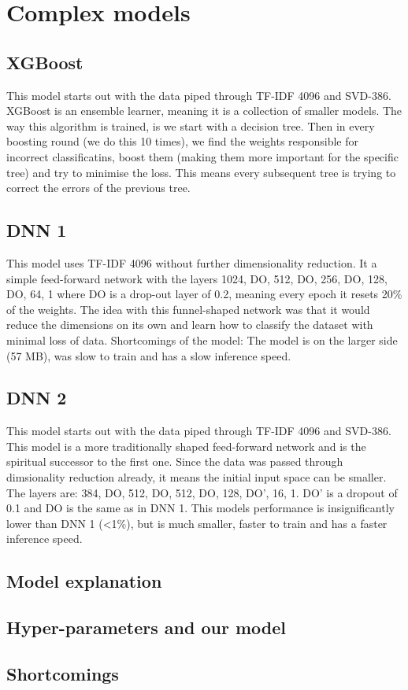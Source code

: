 \section{Complex models}
\subsection{XGBoost}
This model starts out with the data piped through TF-IDF 4096 and SVD-386. XGBoost is an ensemble learner, meaning it is a collection of smaller models. The way this algorithm is trained, is we start with a decision tree. Then in every boosting round (we do this 10 times), we find the weights responsible for incorrect classificatins, boost them (making them more important for the specific tree) and try to minimise the loss. This means every subsequent tree is trying to correct the errors of the previous tree.

\subsection{DNN 1}
This model uses TF-IDF 4096 without further dimensionality reduction. It a simple feed-forward network with the layers 1024, DO, 512, DO, 256, DO, 128, DO, 64, 1 where DO is a drop-out layer of 0.2, meaning every epoch it resets 20\% of the weights. The idea with this funnel-shaped network was that it would reduce the dimensions on its own and learn how to classify the dataset with minimal loss of data. Shortcomings of the model: The model is on the larger side (57 MB), was slow to train and has a slow inference speed.

\subsection{DNN 2}
This model starts out with the data piped through TF-IDF 4096 and SVD-386. This model is a more traditionally shaped feed-forward network and is the spiritual successor to the first one. Since the data was passed through dimsionality reduction already, it means the initial input space can be smaller. The layers are: 384, DO, 512, DO, 512, DO, 128, DO', 16, 1. DO' is a dropout of 0.1 and DO is the same as in DNN 1. This models performance is insignificantly lower than DNN 1 (<1\%), but is much smaller, faster to train and has a faster inference speed.

\subsection{Model explanation}
\subsection{Hyper-parameters and our model}
\subsection{Shortcomings}
